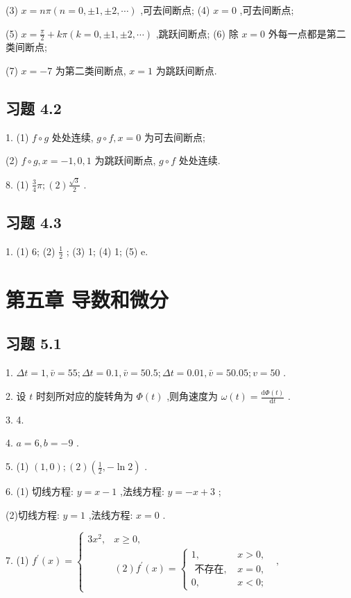 (3) \(x = {n\pi }\left( {n = 0, \pm  1, \pm  2,\cdots }\right)\) ,可去间断点; (4) \(x = 0\) ,可去间断点;

(5) \(x = \frac{\pi }{2} + {k\pi }\left( {k = 0, \pm  1, \pm  2,\cdots }\right)\) ,跳跃间断点; (6) 除 \(x = 0\) 外每一点都是第二类间断点;

(7) \(x =  - 7\) 为第二类间断点, \(x = 1\) 为跳跃间断点.

\subsection{习题 4.2}

1. (1) \(f \circ  g\) 处处连续, \(g \circ  f,x = 0\) 为可去间断点;

(2) \(f \circ  g,x =  - 1,0,1\) 为跳跃间断点, \(g \circ  f\) 处处连续.

8. (1) \(\frac{3}{4}\pi ;\left( 2\right) \frac{\sqrt{3}}{2}\) .

\subsection{习题 4.3}

1. (1) 6; (2) \(\frac{1}{2}\) ; (3) 1; (4) 1; (5) e.

\section{第五章 导数和微分}

\subsection{习题 5.1}

1. \({\Delta t} = 1,\bar{v} = {55};{\Delta t} = {0.1},\bar{v} = {50.5};{\Delta t} = {0.01},\bar{v} = {50.05};v = {50}\) .

2. 设 \(t\) 时刻所对应的旋转角为 \(\Phi \left( t\right)\) ,则角速度为 \(\omega \left( t\right)  = \frac{\mathrm{d}\Phi \left( t\right) }{\mathrm{d}t}\) .

3. 4.

4. \(a = 6,b =  - 9\) .

5. (1) \(\left( {1,0}\right) ;\left( 2\right) \left( {\frac{1}{2}, - \ln 2}\right)\) .

6. (1) 切线方程: \(y = x - 1\) ,法线方程: \(y =  - x + 3\) ;

(2)切线方程: \(y = 1\) ,法线方程: \(x = 0\) .

7. (1) \({f}^{\prime }\left( x\right)  = \left\{  {\begin{matrix} 3{x}^{2}, & x \geq  0, \\   & \left( 2\right) {f}^{\prime }\left( x\right)  = \left\{  \begin{matrix} 1, & x > 0, \\  \text{ 不存在, } & x = 0, \\  0, & x < 0; \end{matrix}\right.  \end{matrix}\text{ , }}\right.\)

